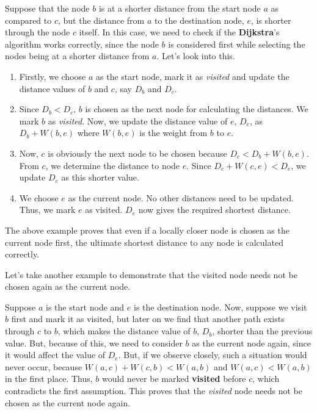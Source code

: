 Suppose that the node $b$ is at a shorter distance from the start node $a$ as compared to $c$, but the distance from $a$ to the destination node, $e$, is shorter through the node $c$ itself. In this case, we need to check if the \textbf{Dijkstra}'s algorithm works correctly, since the node $b$ is considered first while selecting the nodes being at a shorter distance from $a$. Let's look into this.

\begin{enumerate}
\item Firstly, we choose $a$ as the start node, mark it as \textit{visited} and update the distance values of $b$ and $c$, say $D_b$ and $D_c$.
\item Since $D_b < D_c$, $b$ is chosen as the next node for calculating the distances. We mark $b$ as \textit{visited}. Now, we update the distance value of $e$, $D_e$, as $D_b+W(b,e)$ where $W(b,e)$ is the weight from $b$ to $e$.
\item Now, $c$ is obviously the next node to be chosen because $D_c < D_b + W(b,e)$. From $c$, we determine the distance to node $e$. Since $D_c+ W(c, e) < D_e$, we update $D_e$ as this shorter value.
\item We choose $e$ as the current node. No other distances need to be updated. Thus, we mark $e$ as visited. $D_e$  now gives the required shortest distance.
\end{enumerate}

The above example proves that even if a locally closer node is chosen as the current node first, the ultimate shortest distance to any node is calculated correctly.

Let's take another example to demonstrate that the visited node needs not be chosen again as the current node.

\begin{figure}[H]
\end{figure}


Suppose $a$ is the start node and $e$ is the destination node. Now, suppose we visit $b$ first and mark it as visited, but later on we find that another path exists through $c$ to $b$, which makes the distance value of $b$, $D_b$, shorter than the previous value. But, because of this, we need to consider $b$ as the current node again, since it would affect the value of $D_e$. But, if we observe closely, such a situation would never occur, because $W(a,c) + W(c,b) < W(a,b)$ and $W(a,c) < W(a,b)$ in the first place. Thus, $b$ would never be marked \textbf{visited} before $c$, which contradicts the first assumption. This proves that the \textit{visited} node needs not be chosen as the current node again.

